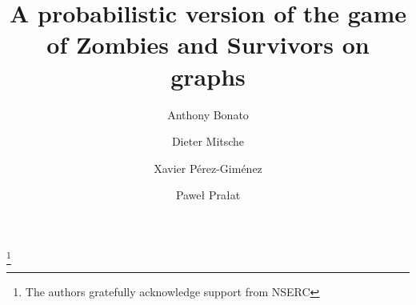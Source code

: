 \documentclass[12pt]{amsart}
\begin{document}
\newtheorem{theorem}{Theorem}[section]
\newtheorem{lemma}[theorem]{Lemma}
\newtheorem{definition}[theorem]{Definition}
\newtheorem{conjecture}[theorem]{Conjecture}
\newtheorem{proposition}[theorem]{Proposition}
\newtheorem{algorithm}[theorem]{Algorithm}
\newtheorem{corollary}[theorem]{Corollary}
\newtheorem{observation}[theorem]{Observation}
\newtheorem{claim}[theorem]{Claim}
\newtheorem{problem}[theorem]{Open Problem}
\newtheorem{remark}[theorem]{Remark}
\newcommand{\noin}{\noindent}
\newcommand{\ind}{\indent}
\newcommand{\om}{\omega}
\newcommand{\I}{\mathcal I}
\newcommand{\N}{{\mathbb N}}
\newcommand{\Z}{{\mathbb Z}}
\newcommand{\LL}{\mathbb{L}}
\newcommand{\R}{{\mathbb R}}
\newcommand{\E}[1]{\mathbb{E}\left[#1 \right]}
\newcommand{\V}{\mathbb Var}
\newcommand{\Prob}{\mathbb{P}}
\newcommand{\eps}{\varepsilon}
\newcommand{\bsigma}{{\boldsymbol\sigma}}
\newcommand{\bm}{{\boldsymbol m}}
\newcommand{\bu}{{\boldsymbol u}}
\newcommand{\bv}{{\boldsymbol v}}
\newcommand{\tU}{{\mathtt U}}
\newcommand{\tD}{{\mathtt D}}
\newcommand{\tL}{{\mathtt L}}
\newcommand{\tR}{{\mathtt R}}

\newcommand{\Tv}{P}

\newcommand{\mT}{\mathcal{T}}
\newcommand{\mS}{\mathcal{S}}
\newcommand{\mA}{\mathcal{A}}
\newcommand{\mB}{\mathcal{B}}

\newcommand{\Cyc}[1]{\mathrm{Cyc}\left(#1\right)}
\newcommand{\Seq}[1]{\mathrm{Seq}\left(#1\right)}
\newcommand{\Mul}[1]{\mathrm{Mul}\left(#1\right)}
\newcommand{\Mulo}[1]{\mathrm{Mul}_{>0}\left(#1\right)}
\newcommand{\Set}[1]{\mathrm{Set}\left(#1\right)}
\newcommand{\Setd}[1]{\mathrm{Set}_{d}\left(#1\right)}
\newcommand{\Bin}{\mathrm{Bin}}

\title{A probabilistic version of the game of Zombies and Survivors on graphs}
\author{Anthony Bonato}
\address{Department of Mathematics, Ryerson University, Toronto, ON, Canada}
\author{Dieter Mitsche}
\address{Universit\'{e} de Nice Sophia-Antipolis, Nice, France}
\author{Xavier P\'{e}rez-Gim\'{e}nez}
\address{Department of Mathematics, Ryerson University, Toronto, ON, Canada}
\author{Pawe\l{} Pra\l{}at}
\address{Department of Mathematics, Ryerson University, Toronto, ON, Canada}

 
\thanks{The authors gratefully acknowledge support from NSERC}
\end{document}
